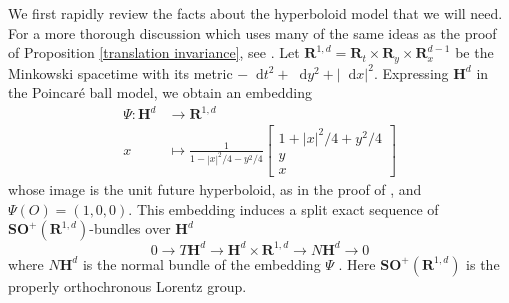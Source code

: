 \documentclass[reqno,10pt]{amsart}
\newcommand{\RR}{\mathbf{R}}
\newcommand{\Hyp}{\mathbf H}
\newcommand{\SpOrth}{\mathbf{SO}}
\newcommand*\dif{\mathop{}\!\mathrm{d}}
\theoremstyle{definition}
\numberwithin{equation}{section}
\begin{document}
We first rapidly review the facts about the hyperboloid model that we will need.
For a more thorough discussion which uses many of the same ideas as the proof of Proposition \ref{translation invariance}, see \cite[\S3.1, \S4.1]{daskalopoulosPrep1}.
Let $\RR^{1, d} = \RR_t \times \RR_y \times \RR_x^{d - 1}$ be the Minkowski spacetime with its metric $-\dif t^2 + \dif y^2 + |\dif x|^2$.
Expressing $\Hyp^d$ in the Poincar\'e ball model, we obtain an embedding
\begin{align*}
\Psi: \Hyp^d &\to \RR^{1, d} \\
x &\mapsto \frac{1}{1 - |x|^2/4 - y^2/4} \begin{bmatrix}1 + |x|^2/4 + y^2/4\\y \\ x\end{bmatrix}
\end{align*}
whose image is the unit future hyperboloid, as in the proof of \cite[Proposition 3.5]{lee1997riemannian}, and $\Psi(O) = (1, 0, 0)$.
This embedding induces a split exact sequence of $\SpOrth^+(\RR^{1, d})$-bundles over $\Hyp^d$
\begin{equation}\label{splitting of tangent bundle}
0 \to T\Hyp^d \to \Hyp^d \times \RR^{1, d} \to N\Hyp^d \to 0
\end{equation}
where $N\Hyp^d$ is the normal bundle of the embedding $\Psi$ \cite[(3.4)]{daskalopoulosPrep1}.
Here $\SpOrth^+(\RR^{1, d})$ is the properly orthochronous Lorentz group.
\end{document}
